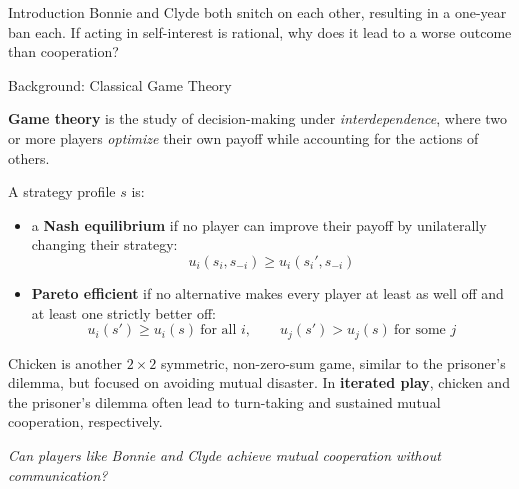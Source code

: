 \documentclass[final]{beamer}
\newlength{\colwidth}
\begin{document}
\begin{frame}[t]
\begin{columns}[t]
\begin{column}{\colwidth}
\begin{block}{Introduction}
					Bonnie and Clyde both snitch on each other, resulting in a one-year ban each. If acting in self-interest is rational, why does it lead to a worse outcome than cooperation?
					
					
				\end{block}
				
				
				\begin{block}{Background: Classical Game Theory}
					
					\textbf{Game theory} is the study of decision-making under \textit{interdependence}, where two or more players \textit{optimize} their own payoff while accounting for the actions of others\cite{doi:10.1142/10634}.
					
					
					A strategy profile $s$ is:
					
					\begin{itemize}
						\item a \textbf{Nash equilibrium} if no player can improve their payoff by unilaterally changing their strategy:
						\[
						u_i(s_i, s_{-i}) \ge u_i(s_i', s_{-i})
						\]
						
						\item \textbf{Pareto efficient} if no alternative makes every player at least as well off and at least one strictly better off:
						\[
						u_i(s') \ge u_i(s) \ \text{for all } i,
						\qquad
						u_j(s') > u_j(s) \ \text{for some } j
						\]
					\end{itemize}
					
					
					Chicken is another $2 \times 2$ symmetric, non-zero-sum game, similar to the prisoner's dilemma, but focused on avoiding mutual disaster. In \textbf{iterated play}, chicken and the prisoner's dilemma often lead to turn-taking\cite{doi:10.1177/1043463190002004004}\cite{Lau:2012aa} and sustained mutual cooperation\cite{Ikeda_2021}, respectively.
					
					
					
					\begin{center}
						\textcolor{umbcred}{\textit{Can players like Bonnie and Clyde achieve mutual cooperation without communication?}}
					\end{center}
					
				\end{block}
				

\end{column}
\end{columns}
\end{frame}
\end{document}
